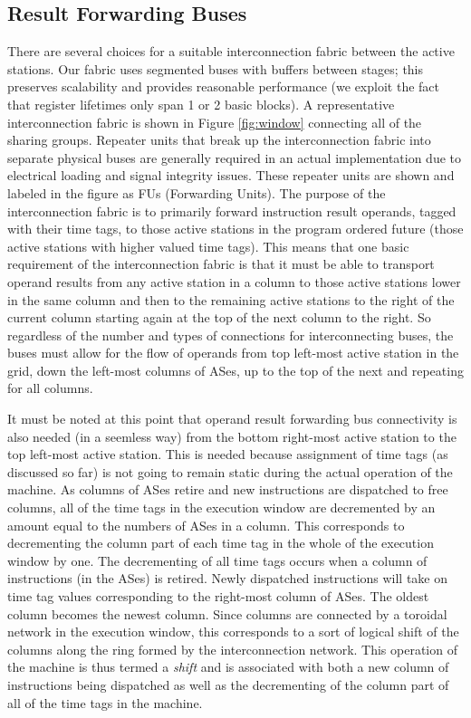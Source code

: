 \documentclass[10pt,dvips]{article}
\begin{document}
\subsection{Result Forwarding Buses}
%
There are several choices for a suitable interconnection fabric between
the active stations.  
Our fabric uses segmented buses with buffers
between stages; this preserves
scalability and provides reasonable performance (we exploit the fact
that register lifetimes only span 1 or 2 basic blocks).
A representative interconnection fabric is shown in Figure \ref{fig:window}
connecting all of the sharing groups.
Repeater units that break up the interconnection 
fabric into separate physical buses
are generally required in an actual implementation due to electrical
loading and signal integrity issues.  These repeater units are shown and
labeled in the figure as FUs (Forwarding Units).
The purpose of the
interconnection fabric is to primarily forward instruction result
operands, tagged with their time tags, 
to those active stations in the program ordered future (those
active stations with higher valued time tags).  This means that one
basic requirement of the interconnection fabric is that it must be able
to transport operand results from any active station in a column to
those active stations lower in the same column and then to the remaining
active stations to the right of the current column starting again at
the top of the next column to the right.  So regardless of the number
and types of connections for interconnecting buses, the buses must
allow for the flow of operands from top left-most active station in the
grid, down the left-most columns of ASes, up to the top of the next and
repeating for all columns.

It must be noted at this point that operand result forwarding
bus connectivity is also needed (in a seemless way) from the bottom
right-most active station to the top left-most active station.
This is needed because assignment of time tags (as discussed so far)
is not going to remain static during the actual operation of the machine.
As columns of ASes retire and new instructions are dispatched to
free columns,
all of the time tags in the execution window are decremented by
an amount equal to the numbers of ASes in a column.  This corresponds
to decrementing the column part of each time tag in the whole of the
execution window by one.  The decrementing of all time tags
occurs when a column of instructions (in the ASes) is retired.
Newly dispatched instructions will take on
time tag values corresponding to the right-most 
column of ASes.  The oldest column becomes the 
newest column.  Since columns are connected by a toroidal network in the
execution window, this corresponds to a sort of logical shift
of the columns along the ring formed by the interconnection
network.  This operation of the machine is thus termed a \textit{shift}
and is associated with both a new column of instructions being dispatched
as well as the decrementing of the column part of all of the time tags
in the machine.
\end{document}

